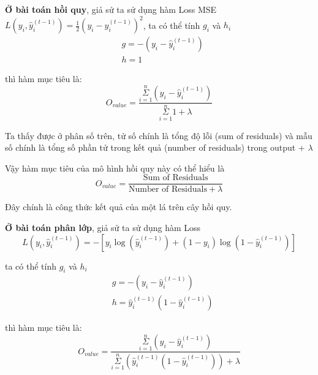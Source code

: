    \textbf{Ở bài toán hồi quy}, giả sử ta sử dụng hàm Loss MSE 
    $ L(y_{i}, \hat{y}_{i}^{(t-1)}) = \frac{1}{2} (y_{i} - \hat{y}_{i}^{(t-1)})^2 $, ta có thể tính $g_{i}$ và $h_{i}$
    \begin{equation}
        \begin{split}
        & g = -(y_{i} - \hat{y}_{i}^{(t-1)})
        \\
        & h = 1
        \end{split}
    \end{equation}
    
    thì hàm mục tiêu là:
    \begin{equation}
        O_{value} = \frac{\underset{i=1}{\overset{n}{\Sigma}} (y_{i} - \hat{y}_{i}^{(t-1)})}
        {\underset{i=1}{\overset{n}{\Sigma}}1 + \lambda}
    \end{equation}
    
    Ta thấy được ở phân số trên, tử số chính là tổng độ lỗi (sum of residuals) và mẫu số chính là tổng số phần tử trong kết quả (number of residuals) trong output + $\lambda$
    
    Vậy hàm mục tiêu của mô hình hồi quy này có thể hiểu là \cite{starmer_2020_XGB}
    \begin{equation}
        O_{value} = \frac{\text{Sum of Residuals}}
        {\text{Number of Residuals} + \lambda}
    \end{equation}
    
    Đây chính là công thức kết quả của một lá trên cây hồi quy.
    
    \textbf{Ở bài toán phân lớp}, giả sử ta sử dụng hàm Loss
    \begin{equation}
        L(y_{i}, \hat{y}_{i}^{(t-1)}) = -[ y_{i} \log(\hat{y}_{i}^{(t-1)}) + (1-y_{i})\log(1-\hat{y}_{i}^{(t-1)})]
    \end{equation}
    
    ta có thể tính $g_{i}$ và $h_{i}$ \cite{starmer_2020_XGB}
    \begin{equation}
        \begin{split}
        & g = -(y_{i} - \hat{y}_{i}^{(t-1)})
        \\
        & h = \hat{y}_{i}^{(t-1)}(1 - \hat{y}_{i}^{(t-1)})
        \end{split}
    \end{equation}
    
    thì hàm mục tiêu là:
    \begin{equation}
        O_{value} = \frac{\underset{i=1}{\overset{n}{\Sigma}} (y_{i} - \hat{y}_{i}^{(t-1)})}
        {\underset{i=1}{\overset{n}{\Sigma}}(\hat{y}_{i}^{(t-1)}(1 - \hat{y}_{i}^{(t-1)})) + \lambda}
    \end{equation}
    
